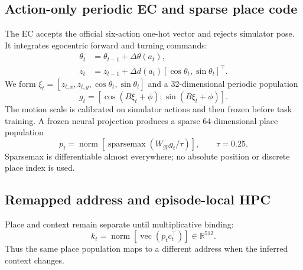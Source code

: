 \documentclass{article}
\newcommand{\hpc}{\textsc{HPC}}
\newcommand{\ec}{\textsc{EC}}
\begin{document}
\subsection{Action-only periodic \ec{} and sparse place code}

The \ec{} accepts the official six-action one-hot vector and rejects simulator pose.
It integrates egocentric forward and turning commands:
\begin{align}
  \theta_t &= \theta_{t-1} + \Delta\theta(a_t),\\
  z_t &= z_{t-1} + \Delta d(a_t)
  [\cos\theta_t,\sin\theta_t]^\top.
\end{align}
We form $\xi_t=[z_{t,x},z_{t,y},\cos\theta_t,\sin\theta_t]$ and a 32-dimensional periodic population
\begin{equation}
  g_t =
  \left[
    \cos(B\xi_t+\phi);
    \sin(B\xi_t+\phi)
  \right].
\end{equation}
The motion scale is calibrated on simulator actions and then frozen before task training.
A frozen neural projection produces a sparse 64-dimensional place population
\begin{equation}
  p_t =
  \operatorname{norm}
  \left[
  \operatorname{sparsemax}\!\left(W_{gp}g_t/\tau\right)
  \right],
  \qquad \tau=0.25.
  \label{eq:place}
\end{equation}
Sparsemax is differentiable almost everywhere; no absolute position or discrete place index is used.

\subsection{Remapped address and episode-local \hpc}

Place and context remain separate until multiplicative binding:
\begin{equation}
  k_t =
  \operatorname{norm}
  \left[
  \operatorname{vec}(p_t c_t^\top)
  \right]
  \in\mathbb{R}^{512}.
  \label{eq:key}
\end{equation}
Thus the same place population maps to a different address when the inferred context changes.
\end{document}
